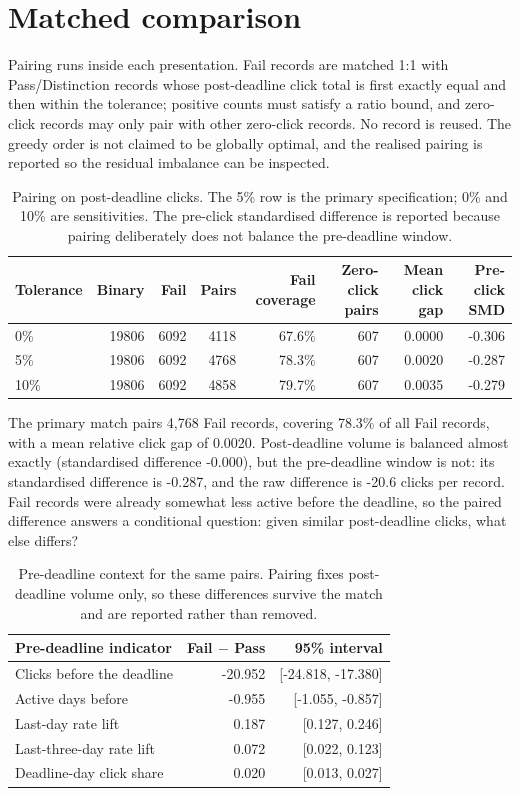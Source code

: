 \documentclass[11pt]{article}
\begin{document}
\section{Matched comparison}
Pairing runs inside each presentation. Fail records are matched 1:1 with Pass/Distinction records whose post-deadline click total is first exactly equal and then within the tolerance; positive counts must satisfy a ratio bound, and zero-click records may only pair with other zero-click records. No record is reused. The greedy order is not claimed to be globally optimal, and the realised pairing is reported so the residual imbalance can be inspected.
\begin{table}[t]
\centering
\footnotesize\setlength{\tabcolsep}{3pt}
\begin{tabular}{lrrrrrrr}
\toprule
Tolerance & Binary & Fail & Pairs & Fail coverage & Zero-click pairs & Mean click gap & Pre-click SMD \\
\midrule
0\% & 19806 & 6092 & 4118 & 67.6\% & 607 & 0.0000 & -0.306 \\
5\% & 19806 & 6092 & 4768 & 78.3\% & 607 & 0.0020 & -0.287 \\
10\% & 19806 & 6092 & 4858 & 79.7\% & 607 & 0.0035 & -0.279 \\
\bottomrule
\end{tabular}
\caption{Pairing on post-deadline clicks. The 5\% row is the primary specification; 0\% and 10\% are sensitivities. The pre-click standardised difference is reported because pairing deliberately does not balance the pre-deadline window.}
\label{tab:pairing}
\end{table}
The primary match pairs 4,768 Fail records, covering 78.3\% of all Fail records, with a mean relative click gap of 0.0020. Post-deadline volume is balanced almost exactly (standardised difference -0.000), but the pre-deadline window is not: its standardised difference is -0.287, and the raw difference is -20.6 clicks per record. Fail records were already somewhat less active before the deadline, so the paired difference answers a conditional question: given similar post-deadline clicks, what else differs?
\begin{table}[t]
\centering
\footnotesize
\begin{tabular}{lrr}
\toprule
Pre-deadline indicator & Fail $-$ Pass & 95\% interval \\
\midrule
Clicks before the deadline & -20.952 & [-24.818, -17.380] \\
Active days before & -0.955 & [-1.055, -0.857] \\
Last-day rate lift & 0.187 & [0.127, 0.246] \\
Last-three-day rate lift & 0.072 & [0.022, 0.123] \\
Deadline-day click share & 0.020 & [0.013, 0.027] \\
\bottomrule
\end{tabular}
\caption{Pre-deadline context for the same pairs. Pairing fixes post-deadline volume only, so these differences survive the match and are reported rather than removed.}
\label{tab:prewindow}
\end{table}
\end{document}
